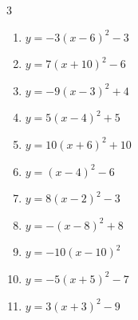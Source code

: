 \begin{multicols}{3}
\begin{enumerate}
        \phantom{$\displaystyle 頂点\left( -8 , -2 \right)$}

  \item $\displaystyle y=-3\left( x-6\right)^{2}-3$

        \phantom{$\displaystyle 頂点\left( 6 , -3 \right)$}

  \item $\displaystyle y=7\left( x+10\right)^{2}-6$

        \phantom{$\displaystyle 頂点\left( -10 , -6 \right)$}

  \item $\displaystyle y=-9\left( x-3\right)^{2}+4$

        \phantom{$\displaystyle 頂点\left( 3 , 4 \right)$}

  \item $\displaystyle y=5\left( x-4\right)^{2}+5$

        \phantom{$\displaystyle 頂点\left( 4 , 5 \right)$}

  \item $\displaystyle y=10\left( x+6\right)^{2}+10$

        \phantom{$\displaystyle 頂点\left( -6 , 10 \right)$}

  \item $\displaystyle y=\left( x-4\right)^{2}-6$

        \phantom{$\displaystyle 頂点\left( 4 , -6 \right)$}

  \item $\displaystyle y=8\left( x-2\right)^{2}-3$

        \phantom{$\displaystyle 頂点\left( 2 , -3 \right)$}

  \item $\displaystyle y=-\left( x-8\right)^{2}+8$

        \phantom{$\displaystyle 頂点\left( 8 , 8 \right)$}

  \item $\displaystyle y=-10\left( x-10\right)^{2}$

        \phantom{$\displaystyle 頂点\left( 10 , 0 \right)$}

  \item $\displaystyle y=-5\left( x+5\right)^{2}-7$

        \phantom{$\displaystyle 頂点\left( -5 , -7 \right)$}

\columnbreak %

\resetques

  \item $\displaystyle y=3\left( x+3\right)^{2}-9$


\end{enumerate}
\end{multicols}
